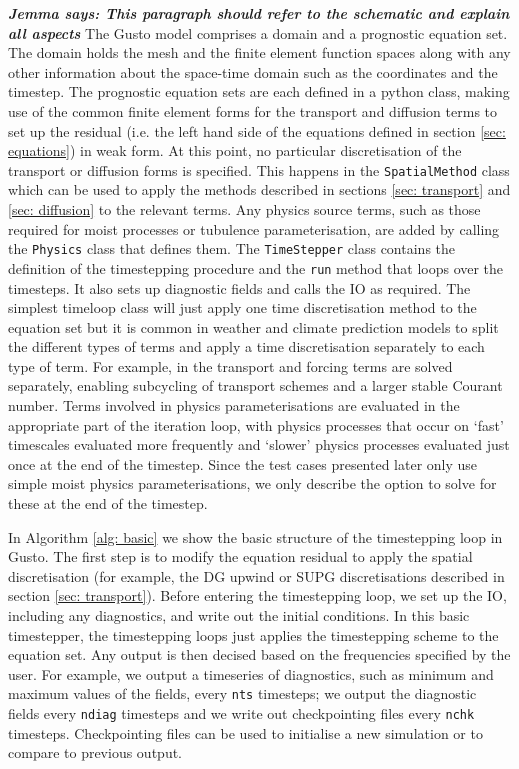 \documentclass[journal abbreviation, manuscript]{copernicus}
\newcommand{\JScomment}[1]{\textit{\textbf{Jemma says: #1}}}
\begin{document}
\JScomment{This paragraph should refer to the schematic and explain
  all aspects} The Gusto model comprises a domain and a prognostic
equation set. The domain holds the mesh and the finite element
function spaces along with any other information about the space-time
domain such as the coordinates and the timestep. The prognostic
equation sets are each defined in a python class, making use of the
common finite element forms for the transport and diffusion terms to
set up the residual (i.e. the left hand side of the equations defined
in section \ref{sec: equations}) in weak form. At this point, no
particular discretisation of the transport or diffusion forms is
specified. This happens in the \texttt{SpatialMethod} class which can
be used to apply the methods described in sections \ref{sec:
  transport} and \ref{sec: diffusion} to the relevant terms. Any
physics source terms, such as those required for moist processes or
tubulence parameterisation, are added by calling the \texttt{Physics}
class that defines them. The \texttt{TimeStepper} class contains the
definition of the timestepping procedure and the \texttt{run} method
that loops over the timesteps. It also sets up diagnostic fields and
calls the IO as required. The simplest timeloop class will just apply
one time discretisation method to the equation set but it is common in
weather and climate prediction models to split the different types of
terms and apply a time discretisation separately to each type of
term. For example, in \citet{} the transport and forcing terms are
solved separately, enabling subcycling of transport schemes and a
larger stable Courant number. Terms involved in physics
parameterisations are evaluated in the appropriate part of the
iteration loop, with physics processes that occur on `fast' timescales
evaluated more frequently and `slower' physics processes evaluated
just once at the end of the timestep. Since the test cases presented
later only use simple moist physics parameterisations, we only
describe the option to solve for these at the end of the timestep.

In Algorithm \ref{alg: basic} we show the basic structure of the
timestepping loop in Gusto. The first step is to modify the equation
residual to apply the spatial discretisation (for example, the DG
upwind or SUPG discretisations described in section \ref{sec:
  transport}). Before entering the timestepping loop, we set up the
IO, including any diagnostics, and write out the initial
conditions. In this basic timestepper, the timestepping loops just
applies the timestepping scheme to the equation set. Any output is
then decised based on the frequencies specified by the user. For
example, we output a timeseries of diagnostics, such as minimum and
maximum values of the fields, every \texttt{nts} timesteps; we output
the diagnostic fields every \texttt{ndiag} timesteps and we write out
checkpointing files every \texttt{nchk} timesteps. Checkpointing files
can be used to initialise a new simulation or to compare to previous
output.
\end{document}
